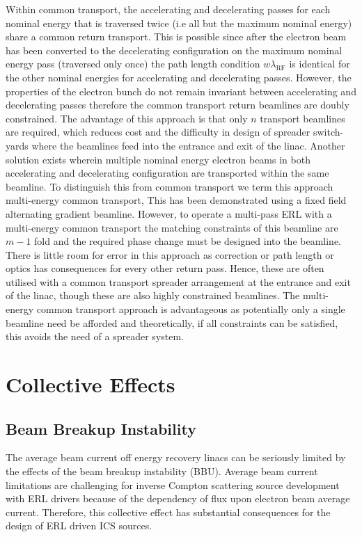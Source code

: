 \documentclass[../main.tex]{subfiles}
\begin{document}
Within common transport, the accelerating and decelerating passes for each nominal energy that is traversed twice (i.e all but the maximum nominal energy) share a common return transport. This is possible since after the electron beam has been converted to the decelerating configuration on the maximum nominal energy pass (traversed only once) the path length condition $w\lambda_{\mathrm{RF}}$ is identical for the other nominal energies for accelerating and decelerating passes. However, the properties of the electron bunch do not remain invariant between accelerating and decelerating passes therefore the common transport return beamlines are doubly constrained. The advantage of this approach is that only $n$ transport beamlines are required, which reduces cost and the difficulty in design of spreader switch-yards where the beamlines feed into the entrance and exit of the linac.   
Another solution exists wherein multiple nominal energy electron beams in both accelerating and decelerating configuration are transported within the same beamline. To distinguish this from common transport we term this approach multi-energy common transport, This has been demonstrated \cite{bartnik2020cbeta} using a fixed field alternating gradient beamline. However, to operate a multi-pass ERL with a multi-energy common transport the matching constraints of this beamline are $m-1$ fold and the required phase change must be designed into the beamline. There is little room for error in this approach as correction or path length or optics has consequences for every other return pass. Hence, these are often utilised with a common transport spreader arrangement at the entrance and exit of the linac, though these are also highly constrained beamlines. The multi-energy common transport approach is advantageous as potentially only a single beamline need be afforded and theoretically, if all constraints can be satisfied, this avoids the need of a spreader system.  

\section{Collective Effects}

\subsection{Beam Breakup Instability}

The average beam current off energy recovery linacs can be seriously limited by the effects of the beam breakup instability (BBU). Average beam current limitations are challenging for inverse Compton scattering source development with ERL drivers because of the dependency of flux upon electron beam average current. Therefore, this collective effect has substantial consequences for the design of ERL driven ICS sources.
\end{document}
